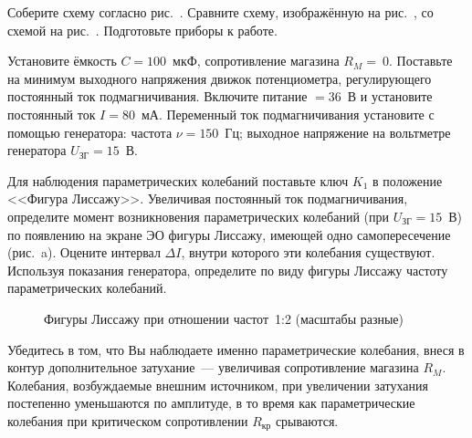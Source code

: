 \begin{lab:task}


\item
Соберите схему согласно рис.~. Сравните схему, изображённую
на рис.~, со схемой на рис.~. Подготовьте приборы к работе.

\item
Установите ёмкость $C = 100$~мкФ, сопротивление магазина $R_M =~0.$ Поставьте на
минимум выходного напряжения движок потенциометра, регулирующего постоянный ток
подмагничивания. Включите питание $= 36$~В и установите постоянный ток $I=80$~мА. Переменный ток подмагничивания установите с помощью генератора: частота
$\nu = 150$~Гц; выходное напряжение на вольтметре генератора $U_\text{ЗГ} =
15$~В.

\item
Для наблюдения параметрических колебаний поставьте ключ $K_1$ в положение
<<Фигура Лиссажу>>. Увеличивая постоянный ток подмагничивания, определите момент
возникновения параметрических колебаний (при $U_\text{ЗГ} = 15$~В) по появлению
на экране ЭО фигуры Лиссажу, имеющей одно самопересечение (рис.~a). Оцените интервал $\Delta I$, внутри которого эти колебания
существуют. Используя показания генератора, определите по виду фигуры Лиссажу
частоту параметрических колебаний.

\begin{figure}[h!]
\centering
	\caption{Фигуры Лиссажу при отношении частот~1:2 (масштабы разные)}
\end{figure}

\item
Убедитесь в том, что Вы наблюдаете именно параметрические колебания, внеся в
контур дополнительное затухание~--- увеличивая сопротивление магазина $R_M$.
Колебания, возбуждаемые внешним источником, при увеличении затухания постепенно
уменьшаются по амплитуде, в то время как параметрические колебания при
критическом сопротивлении $R_\text{кр}$ срываются.


\end{lab:task}

